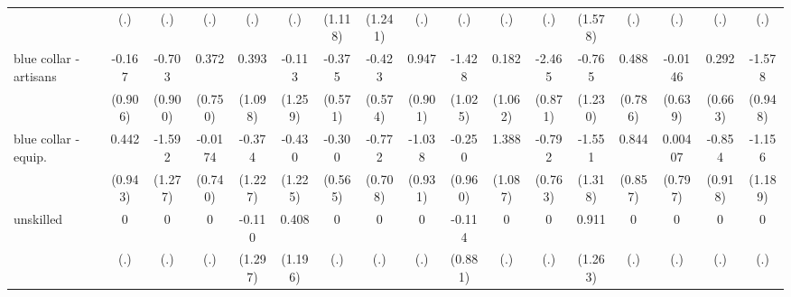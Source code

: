 {\begin{tabular}{l*{16}{c}}
                    &         (.)         &         (.)         &         (.)         &         (.)         &         (.)         &     (1.118)         &     (1.241)         &         (.)         &         (.)         &         (.)         &         (.)         &     (1.578)         &         (.)         &         (.)         &         (.)         &         (.)         \\
[1em]
blue collar - artisans&      -0.167         &      -0.703         &       0.372         &       0.393         &      -0.113         &      -0.375         &      -0.423         &       0.947         &      -1.428         &       0.182         &      -2.465\sym{**} &      -0.765         &       0.488         &     -0.0146         &       0.292         &      -1.578         \\
                    &     (0.906)         &     (0.900)         &     (0.750)         &     (1.098)         &     (1.259)         &     (0.571)         &     (0.574)         &     (0.901)         &     (1.025)         &     (1.062)         &     (0.871)         &     (1.230)         &     (0.786)         &     (0.639)         &     (0.663)         &     (0.948)         \\
[1em]
blue collar - equip.&       0.442         &      -1.592         &     -0.0174         &      -0.374         &      -0.430         &      -0.300         &      -0.772         &      -1.038         &      -0.250         &       1.388         &      -0.792         &      -1.551         &       0.844         &     0.00407         &      -0.854         &      -1.156         \\
                    &     (0.943)         &     (1.277)         &     (0.740)         &     (1.227)         &     (1.225)         &     (0.565)         &     (0.708)         &     (0.931)         &     (0.960)         &     (1.087)         &     (0.763)         &     (1.318)         &     (0.857)         &     (0.797)         &     (0.918)         &     (1.189)         \\
[1em]
unskilled           &           0         &           0         &           0         &      -0.110         &       0.408         &           0         &           0         &           0         &      -0.114         &           0         &           0         &       0.911         &           0         &           0         &           0         &           0         \\
                    &         (.)         &         (.)         &         (.)         &     (1.297)         &     (1.196)         &         (.)         &         (.)         &         (.)         &     (0.881)         &         (.)         &         (.)         &     (1.263)         &         (.)         &         (.)         &         (.)         &         (.)         \\

\end{tabular}}
